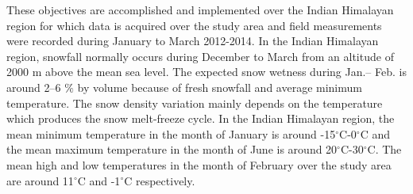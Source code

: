 %	

These objectives are accomplished and implemented over the Indian Himalayan region for which data is acquired over the study area and field measurements were recorded during January to March 2012-2014. In the Indian Himalayan region, snowfall normally occurs during December to March from an altitude of 2000 m above the mean sea level. The expected snow wetness during Jan.-- Feb. is around 2--6 $\%$ by volume because of fresh snowfall and average minimum temperature. The snow density variation mainly depends on the temperature which produces the snow melt-freeze cycle. In the Indian Himalayan region, the mean minimum temperature in the month of January is around -15$^\circ$C-0$^\circ$C and the mean maximum temperature in the month of June is around 20$^\circ$C-30$^\circ$C. The mean high and low temperatures in the month of February over the study area are around 11$^\circ$C  and -1$^\circ$C respectively.
	  
